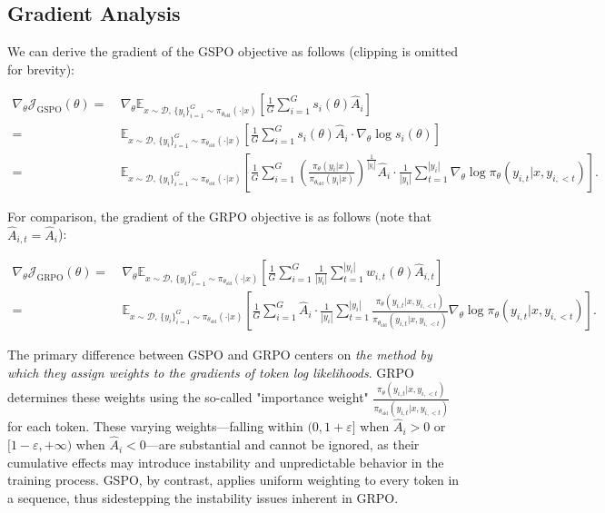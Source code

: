 \subsection{Gradient Analysis}
\label{subsec:gradient}

We can derive the gradient of the GSPO objective as follows (clipping is omitted for brevity):

\begin{align}
\nabla_{\theta} \mathcal{J}_\text{GSPO} (\theta)
=&\ 
\nabla_{\theta} \mathbb{E}_{ x \sim \mathcal{D},\, \{y_i\}_{i=1}^G \sim \pi_{\theta_\text{old}}( \cdot | x) }
\left[ 
\frac{1}{G} \sum_{i=1}^{G} s_{i}(\theta) \widehat{A}_{i}
\right] \\
= &\ 
\mathbb{E}_{ x \sim \mathcal{D},\, \{y_i\}_{i=1}^G \sim \pi_{\theta_\text{old}}( \cdot | x) }
\left[ 
\frac{1}{G} \sum_{i=1}^{G}
s_{i}(\theta) \widehat{A}_{i}
\cdot \nabla_{\theta} \log s_{i}(\theta)
\right] \\
=&\ 
\mathbb{E}_{ x \sim \mathcal{D},\, \{y_i\}_{i=1}^G \sim \pi_{\theta_\text{old}}( \cdot | x) }
\left[ 
\frac{1}{G} \sum_{i=1}^{G} 
\left( \frac{ \pi_{\theta} (y_i | x) }{ \pi_{\theta_\text{old}} (y_i | x)} \right)^{\frac{1}{|y_i|}} \widehat{A}_{i} 
\cdot \frac{1}{|y_i|} \sum_{t=1}^{|y_i|} \nabla_{\theta} \log \pi_{\theta} (y_{i,t} | x, y_{i,<t}) 
\right].
\label{equ:gspo_grad}
\end{align}

For comparison, the gradient of the GRPO objective is as follows (note that $\widehat{A}_{i,t} = \widehat{A}_{i}$):

\begin{align}
\nabla_{\theta} \mathcal{J}_\text{GRPO} (\theta) 
=&\ 
\nabla_{\theta} \mathbb{E}_{ x \sim \mathcal{D},\, \{y_i\}_{i=1}^G \sim \pi_{\theta_\text{old}}( \cdot | x) }
\left[ \frac{1}{G} \sum_{i=1}^{G} \frac{1}{|y_i|} \sum_{t=1}^{|y_i|} 
w_{i,t}(\theta) \widehat{A}_{i,t}
\right] \\
=&\
\mathbb{E}_{ x \sim \mathcal{D},\, \{y_i\}_{i=1}^G \sim \pi_{\theta_\text{old}}( \cdot | x) }
\left[ \frac{1}{G} \sum_{i=1}^{G} \widehat{A}_{i} 
\cdot \frac{1}{|y_i|} \sum_{t=1}^{|y_i|} 
\frac{ \pi_{\theta} (y_{i,t} | x, y_{i,<t}) }{ \pi_{\theta_\text{old}} (y_{i,t} | x,y_{i,<t})} 
\nabla_{\theta} \log \pi_{\theta} (y_{i,t} | x, y_{i,<t})  
\right].
\end{align}

The primary difference between GSPO and GRPO centers on \textit{the method by which they assign weights to the gradients of token log likelihoods}. GRPO determines these weights using the so-called "importance weight" $\frac{ \pi_{\theta} (y_{i,t} | x, y_{i,<t}) }{ \pi_{\theta_\text{old}} (y_{i,t} | x,y_{i,<t})}$ for each token. These varying weights—falling within $(0, 1+\varepsilon]$ when $\widehat{A}_{i} >0$ or $[1-\varepsilon, +\infty)$ when $\widehat{A}_{i} < 0$—are substantial and cannot be ignored, as their cumulative effects may introduce instability and unpredictable behavior in the training process. GSPO, by contrast, applies uniform weighting to every token in a sequence, thus sidestepping the instability issues inherent in GRPO.

